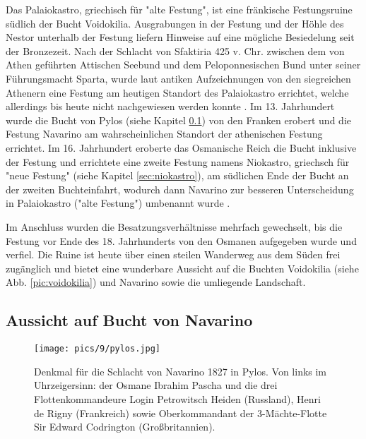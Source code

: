 \documentclass[preprint]{geomorphica} %
\begin{document}
Das Palaiokastro, griechisch für "alte Festung", ist eine fränkische Festungsruine südlich der Bucht Voidokilia. Ausgrabungen in der Festung und der Höhle des Nestor unterhalb der Festung liefern Hinweise auf eine mögliche Besiedelung seit der Bronzezeit. Nach der Schlacht von Sfaktiria 425 v. Chr. zwischen dem von Athen geführten Attischen Seebund und dem Peloponnesischen Bund unter seiner Führungsmacht Sparta, wurde laut antiken Aufzeichnungen von den siegreichen Athenern eine Festung am heutigen Standort des Palaiokastro errichtet, welche allerdings bis heute nicht nachgewiesen werden konnte \cite{Davis2008}. Im 13. Jahrhundert wurde die Bucht von Pylos (siehe Kapitel \ref{sec:navarino}) von den Franken erobert und die Festung Navarino am wahrscheinlichen Standort der athenischen Festung errichtet. Im 16. Jahrhundert eroberte das Osmanische Reich die Bucht inklusive der Festung und errichtete eine zweite Festung namens Niokastro, griechsch für "neue Festung" (siehe Kapitel \ref{sec:niokastro}), am südlichen Ende der Bucht an der zweiten Buchteinfahrt, wodurch dann Navarino zur besseren Unterscheidung in Palaiokastro ("alte Festung") umbenannt wurde \cite{Davis2008}.

Im Anschluss wurden die Besatzungsverhältnisse mehrfach gewechselt, bis die Festung vor Ende des 18. Jahrhunderts von den Osmanen aufgegeben wurde und verfiel. Die Ruine ist heute über einen steilen Wanderweg aus dem Süden frei zugänglich und bietet eine wunderbare Aussicht auf die Buchten Voidokilia (siehe Abb. \ref{pic:voidokilia}) und Navarino sowie die umliegende Landschaft.

\newpage

\subsection{Aussicht auf Bucht von Navarino}
\label{sec:navarino}

\begin{wrapfigure}{r}{0.3\textwidth}
    \centering
    \texttt{[image: pics/9/pylos.jpg]}
    \caption{Denkmal für die Schlacht von Navarino 1827 in Pylos. Von links im Uhrzeigersinn: der Osmane Ibrahim Pascha und die drei Flottenkommandeure Login Petrowitsch Heiden (Russland), Henri de Rigny (Frankreich) sowie Oberkommandant der 3-Mächte-Flotte Sir Edward Codrington (Großbritannien).}
    \label{pic:pylos}
\end{wrapfigure}
\end{document}
